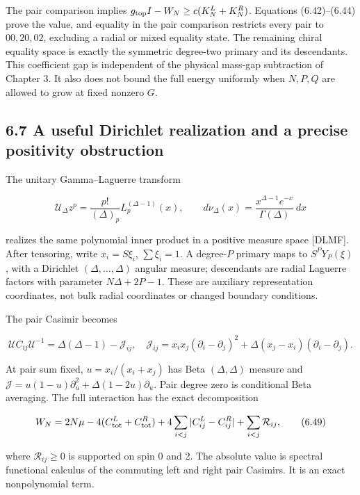 The pair comparison implies \(g_{\rm top}I-W_N\ge c(K_N^L+K_N^R)\). Equations (6.42)--(6.44) prove the value, and equality in the pair comparison restricts every pair to \(00,20,02\), excluding a radial or mixed equality state. The remaining chiral equality space is exactly the symmetric degree-two primary and its descendants. This coefficient gap is independent of the physical mass-gap subtraction of Chapter 3. It also does not bound the full energy uniformly when \(N,P,Q\) are allowed to grow at fixed nonzero \(G\).

\hypertarget{a-useful-dirichlet-realization-and-a-precise-positivity-obstruction}{%
\subsection{6.7 A useful Dirichlet realization and a precise positivity obstruction}\label{a-useful-dirichlet-realization-and-a-precise-positivity-obstruction}}

The unitary Gamma--Laguerre transform

\[
\mathcal U_\Delta z^p=\frac{p!}{(\Delta)_p}L_p^{(\Delta-1)}(x),
\qquad d\nu_\Delta(x)=\frac{x^{\Delta-1}e^{-x}}{\Gamma(\Delta)}\,dx
\tag{6.47}
\]

realizes the same polynomial inner product in a positive measure space {[}DLMF{]}. After tensoring, write \(x_i=S\xi_i\), \(\sum\xi_i=1\). A degree-\(P\) primary maps to \(S^PY_P(\xi)\), with a Dirichlet \((\Delta,\ldots,\Delta)\) angular measure; descendants are radial Laguerre factors with parameter \(N\Delta+2P-1\). These are auxiliary representation coordinates, not bulk radial coordinates or changed boundary conditions.

The pair Casimir becomes

\[
\mathcal U C_{ij}\mathcal U^{-1}=\Delta(\Delta-1)-\mathcal J_{ij},
\quad
\mathcal J_{ij}=x_ix_j(\partial_i-\partial_j)^2
+\Delta(x_j-x_i)(\partial_i-\partial_j).
\tag{6.48}
\]

At pair sum fixed, \(u=x_i/(x_i+x_j)\) has Beta \((\Delta,\Delta)\) measure and \(\mathcal J=u(1-u)\partial_u^2+\Delta(1-2u)\partial_u\). Pair degree zero is conditional Beta averaging. The full interaction has the exact decomposition

\[
W_N=2N\mu-4(C_{\rm tot}^L+C_{\rm tot}^R)
+4\sum_{i<j}|C_{ij}^L-C_{ij}^R|+\sum_{i<j}\mathcal R_{ij},
\tag{6.49}
\]

where \(\mathcal R_{ij}\ge0\) is supported on spin 0 and 2. The absolute value is spectral functional calculus of the commuting left and right pair Casimirs. It is an exact nonpolynomial term.

